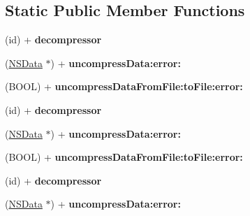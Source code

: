 \subsection*{\-Static \-Public \-Member \-Functions}
\begin{DoxyCompactItemize}
\item 
\hypertarget{interface_a_s_i_data_decompressor_a1d8177f77b67ffe4651a0310acd667c9}{
(id) + {\bfseries decompressor}}
\label{interface_a_s_i_data_decompressor_a1d8177f77b67ffe4651a0310acd667c9}

\item 
\hypertarget{interface_a_s_i_data_decompressor_ab666cc2cd675eca62a094bb837616a8e}{
(\hyperlink{class_n_s_data}{\-N\-S\-Data} $\ast$) + {\bfseries uncompress\-Data\-:error\-:}}
\label{interface_a_s_i_data_decompressor_ab666cc2cd675eca62a094bb837616a8e}

\item 
\hypertarget{interface_a_s_i_data_decompressor_ade3cc9ba926998aa996714734667a7af}{
(\-B\-O\-O\-L) + {\bfseries uncompress\-Data\-From\-File\-:to\-File\-:error\-:}}
\label{interface_a_s_i_data_decompressor_ade3cc9ba926998aa996714734667a7af}

\item 
\hypertarget{interface_a_s_i_data_decompressor_a1d8177f77b67ffe4651a0310acd667c9}{
(id) + {\bfseries decompressor}}
\label{interface_a_s_i_data_decompressor_a1d8177f77b67ffe4651a0310acd667c9}

\item 
\hypertarget{interface_a_s_i_data_decompressor_ab666cc2cd675eca62a094bb837616a8e}{
(\hyperlink{class_n_s_data}{\-N\-S\-Data} $\ast$) + {\bfseries uncompress\-Data\-:error\-:}}
\label{interface_a_s_i_data_decompressor_ab666cc2cd675eca62a094bb837616a8e}

\item 
\hypertarget{interface_a_s_i_data_decompressor_ade3cc9ba926998aa996714734667a7af}{
(\-B\-O\-O\-L) + {\bfseries uncompress\-Data\-From\-File\-:to\-File\-:error\-:}}
\label{interface_a_s_i_data_decompressor_ade3cc9ba926998aa996714734667a7af}

\item 
\hypertarget{interface_a_s_i_data_decompressor_a1d8177f77b67ffe4651a0310acd667c9}{
(id) + {\bfseries decompressor}}
\label{interface_a_s_i_data_decompressor_a1d8177f77b67ffe4651a0310acd667c9}

\item 
\hypertarget{interface_a_s_i_data_decompressor_ab666cc2cd675eca62a094bb837616a8e}{
(\hyperlink{class_n_s_data}{\-N\-S\-Data} $\ast$) + {\bfseries uncompress\-Data\-:error\-:}}
\label{interface_a_s_i_data_decompressor_ab666cc2cd675eca62a094bb837616a8e}


\end{DoxyCompactItemize}
